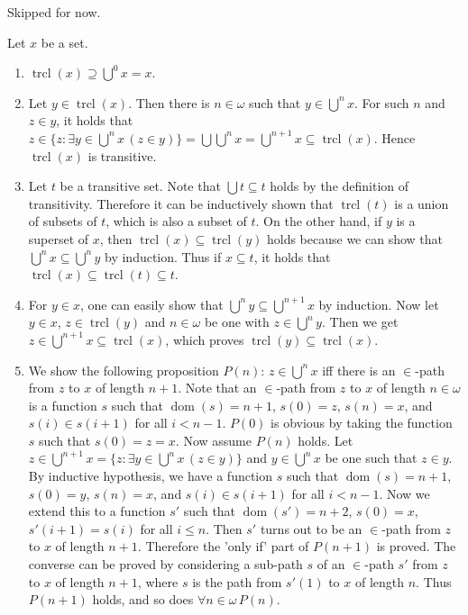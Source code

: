 \documentclass[12pt]{article}
\newcommand{\dom}{\mathop{\mathrm{dom}}}
\newcommand{\trcl}{\mathop{\mathrm{trcl}}}
\theoremstyle{definition}
\newenvironment{customthm}[1]
  {\renewcommand\theinnercustomthm{#1}\innercustomthm}
  {\endinnercustomthm}
\begin{document}
\begin{customthm}{I.8.23} Skipped for now.
\end{customthm}

\begin{customthm}{I.9.6} Let $x$ be a set.
\begin{enumerate}
\item $\trcl(x)\supseteq\bigcup^0x=x$.
\item Let $y\in\trcl(x)$. Then there is $n\in\omega$ such that $y\in\bigcup^nx$. For such $n$ and $z\in y$, it holds that $z\in\{z:\exists y\in\bigcup^nx\,(z\in y)\}=\bigcup\bigcup^nx=\bigcup^{n+1}x\subseteq\trcl(x)$. Hence $\trcl(x)$ is transitive.
\item Let $t$ be a transitive set. Note that $\bigcup t\subseteq t$ holds by the definition of transitivity. Therefore it can be inductively shown that $\trcl(t)$ is a union of subsets of $t$, which is also a subset of $t$. On the other hand, if $y$ is a superset of $x$, then $\trcl(x)\subseteq\trcl(y)$ holds because we can show that $\bigcup^nx\subseteq\bigcup^ny$ by induction. Thus if $x\subseteq t$, it holds that $\trcl(x)\subseteq\trcl(t)\subseteq t$.
\item For $y\in x$, one can easily show that $\bigcup^ny\subseteq\bigcup^{n+1}x$ by induction. Now let $y\in x$, $z\in\trcl(y)$ and $n\in\omega$ be one with $z\in\bigcup^ny$. Then we get $z\in\bigcup^{n+1}x\subseteq\trcl(x)$, which proves $\trcl(y)\subseteq\trcl(x)$.
\item We show the following proposition $P(n)$: $z\in\bigcup^nx$ iff there is an $\in$-path from $z$ to $x$ of length $n+1$. Note that an $\in$-path from $z$ to $x$ of length $n\in\omega$ is a function $s$ such that $\dom(s)=n+1$, $s(0)=z$, $s(n)=x$, and $s(i)\in s(i+1)$ for all $i<n-1$. $P(0)$ is obvious by taking the function $s$ such that $s(0)=z=x$. Now assume $P(n)$ holds. Let $z\in\bigcup^{n+1}x=\{z:\exists y\in\bigcup^nx\,(z\in y)\}$ and $y\in\bigcup^n x$ be one such that $z\in y$. By inductive hypothesis, we have a function $s$ such that $\dom(s)=n+1$, $s(0)=y$, $s(n)=x$, and $s(i)\in s(i+1)$ for all $i<n-1$. Now we extend this to a function $s'$ such that $\dom(s')=n+2$, $s(0)=x$, $s'(i+1)=s(i)$ for all $i\leq n$. Then $s'$ turns out to be an $\in$-path from $z$ to $x$ of length $n+1$. Therefore the 'only if' part of $P(n+1)$ is proved. The converse can be proved by considering a sub-path $s$ of an $\in$-path $s'$ from $z$ to $x$ of length $n+1$, where $s$ is the path from $s'(1)$ to $x$ of length $n$.
Thus $P(n+1)$ holds, and so does $\forall n\in\omega\,P(n)$.
\end{enumerate}
\end{customthm}
\end{document}

